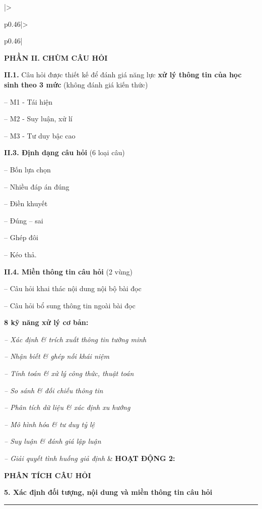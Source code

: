\documentclass[12pt,a4paper,twoside]{article}
\begin{document}
{\begin{longtable}{|>{\raggedright\arraybackslash}p{0.46\textwidth}|>{\raggedright\arraybackslash}p{0.46\textwidth}|}
\textbf{\textcolor{primaryBlue}{PHẦN II. CHÙM CÂU HỎI}}\par\vspace{1pt}
\textbf{II.1.} Câu hỏi được thiết kế để đánh giá năng lực \textbf{xử lý thông tin của học sinh theo 3 mức} (không đánh giá kiến thức)\par
-- M1 - Tái hiện\par
-- M2 - Suy luận, xử lí\par
-- M3 - Tư duy bậc cao\par\vspace{1pt}
\textbf{II.3. Định dạng câu hỏi} (6 loại câu)\par
-- Bốn lựa chọn\par
-- Nhiều đáp án đúng\par
-- Điền khuyết\par
-- Đúng -- sai\par
-- Ghép đôi\par
-- Kéo thả.\par\vspace{1pt}
\textbf{II.4. Miền thông tin câu hỏi} (2 vùng)\par
-- Câu hỏi khai thác nội dung nội bộ bài đọc\par
-- Câu hỏi bổ sung thông tin ngoài bài đọc\par\vspace{3pt}
\textbf{8 kỹ năng xử lý cơ bản:}\par
\textit{-- Xác định \& trích xuất thông tin tường minh}\par
\textit{-- Nhận biết \& ghép nối khái niệm}\par
\textit{-- Tính toán \& xử lý công thức, thuật toán}\par
\textit{-- So sánh \& đối chiếu thông tin}\par
\textit{-- Phân tích dữ liệu \& xác định xu hướng}\par
\textit{-- Mô hình hóa \& tư duy tỷ lệ}\par
\textit{-- Suy luận \& đánh giá lập luận}\par
\textit{-- Giải quyết tình huống giả định}
&
\textbf{\textcolor{sectionMid}{HOẠT ĐỘNG 2:}}\par
\textbf{\textcolor{sectionMid}{PHÂN TÍCH CÂU HỎI}}\par\vspace{1pt}
\textbf{5. Xác định đối tượng, nội dung và miền thông tin câu hỏi}\par
\vspace{4pt}\noindent\rule{\linewidth}{0.4pt}\par\vspace{4pt}

\end{longtable}}
\end{document}
